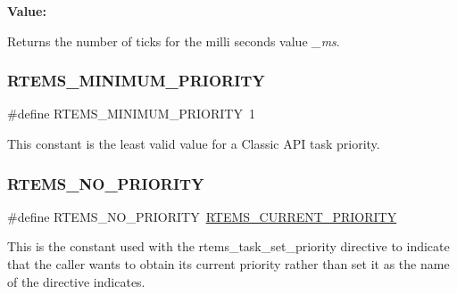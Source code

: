 {\bfseries Value\+:}
\begin{DoxyCode}{0}

\end{DoxyCode}


Returns the number of ticks for the milli seconds value {\itshape \+\_\+ms}. 

\mbox{\label{group__ClassicTasks_ga4f6daa11e05fc2d5f47e8426a4d6d4d5}} 
\subsubsection{\texorpdfstring{RTEMS\_MINIMUM\_PRIORITY}{RTEMS\_MINIMUM\_PRIORITY}}
{\footnotesize\ttfamily \#define R\+T\+E\+M\+S\+\_\+\+M\+I\+N\+I\+M\+U\+M\+\_\+\+P\+R\+I\+O\+R\+I\+TY~1}

This constant is the least valid value for a Classic A\+PI task priority. \mbox{\label{group__ClassicTasks_ga3ba355e613ccbe3d0a4a80b961d5832b}} 
\subsubsection{\texorpdfstring{RTEMS\_NO\_PRIORITY}{RTEMS\_NO\_PRIORITY}}
{\footnotesize\ttfamily \#define R\+T\+E\+M\+S\+\_\+\+N\+O\+\_\+\+P\+R\+I\+O\+R\+I\+TY~\mbox{\hyperlink{group__ClassicTasks_ga49bfed4e201631e3a17158e32dc0314b}{R\+T\+E\+M\+S\+\_\+\+C\+U\+R\+R\+E\+N\+T\+\_\+\+P\+R\+I\+O\+R\+I\+TY}}}

This is the constant used with the rtems\+\_\+task\+\_\+set\+\_\+priority directive to indicate that the caller wants to obtain its current priority rather than set it as the name of the directive indicates. \mbox{\label{group__ClassicTasks_gac7891d8a0bfe04de75c7c9e89f174cab}} 

